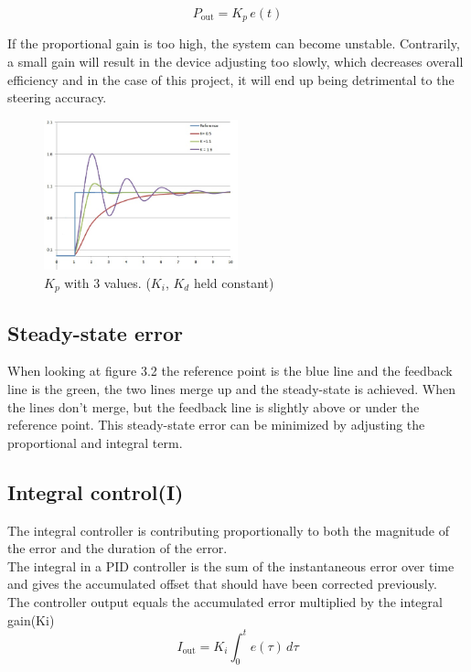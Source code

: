 $$ P_{\mathrm{out}}=K_p\,{e(t)}$$  

If the proportional gain is too high, the system can become unstable. Contrarily, a small gain will result in the device adjusting too slowly, which decreases overall efficiency and in the case of this project, it will end up being detrimental to the steering accuracy.


\begin{figure}[h!]
  \centering
  \includegraphics[width=0.5\textwidth]{figures/PIDP.jpg}
  
  \caption{$K_p$ with 3 values. ($K_i$, $K_d$ held constant)} 
  \label{PID controller}
\end{figure}

\subsection {Steady-state error}

When looking at figure 3.2 the reference point is the blue line and the feedback line is the green, the two lines merge up and the steady-state is achieved. When the lines don't merge, but the feedback line is slightly above or under the reference point. This steady-state error can be minimized by adjusting the proportional and integral term. 

\subsection {Integral control(I)}

The integral controller is contributing proportionally to both the magnitude of the error and the duration of the error. \\
The integral in a PID controller is the sum of the instantaneous error over time and gives the accumulated offset that should have been corrected previously. \\ 

The controller output equals the accumulated error multiplied by the integral gain(Ki)\\
$$I_{\mathrm{out}}=K_{i}\int_{0}^{t}{e(\tau)}\,{d\tau}$$ 

